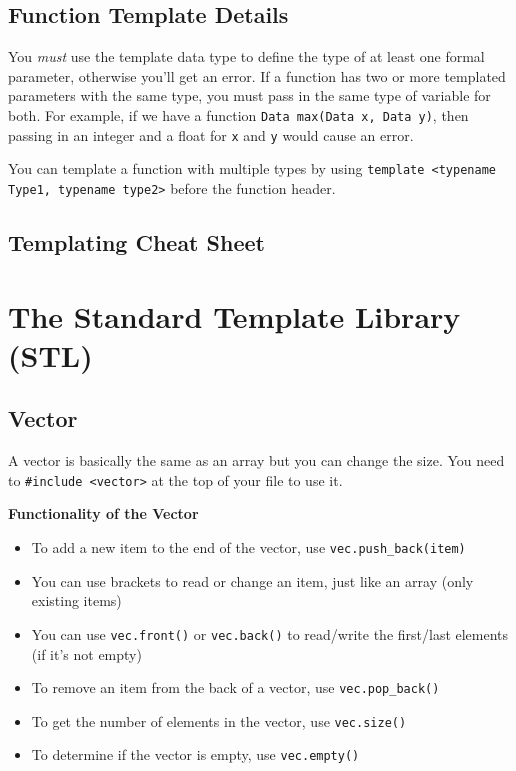 \documentclass[class=article, crop=false]{standalone}
\begin{document}
  \subsection{Function Template Details}
  You \emph{must} use the template data type to define the type of at least one formal parameter, otherwise you'll get an error. If a function has two or more templated parameters with the same type, you must pass in the same type of variable for both. For example, if we have a function \texttt{Data max(Data x, Data y)}, then passing in an integer and a float for \texttt{x} and \texttt{y} would cause an error. \par
  You can template a function with multiple types by using \texttt{template <typename Type1, typename type2>} before the function header.
  \subsection{Templating Cheat Sheet}
  \begin{center}\end{center}
  \section{The Standard Template Library (STL)}
  \subsection{Vector}
  A vector is basically the same as an array but you can change the size. You need to \texttt{\#include <vector>} at the top of your file to use it. \par
  \textbf{Functionality of the Vector}
  \begin{itemize}
    \item To add a new item to the end of the vector, use \texttt{vec.push\_back(item)}
    \item You can use brackets to read or change an item, just like an array (only existing items)
    \item You can use \texttt{vec.front()} or \texttt{vec.back()} to read/write the first/last elements (if it's not empty) 
    \item To remove an item from the back of a vector, use \texttt{vec.pop\_back()}
    \item To get the number of elements in the vector, use \texttt{vec.size()}
    \item To determine if the vector is empty, use \texttt{vec.empty()}
  \end{itemize}
\end{document}
